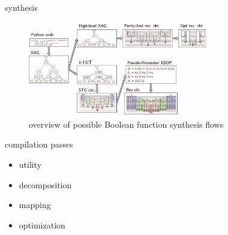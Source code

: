 \begin{frame}{synthesis}
  \begin{figure}[htbq]
    \centering
    \includegraphics[width=0.7\textwidth]{figure/boolean.png}
    \caption{overview of possible Boolean function synthesis flows} 
    \label{fig-boolean}
  \end{figure}
\end{frame}
\begin{frame}{compilation passes}
  \begin{itemize}
    \item utility
    \item decomposition
    \item mapping
    \item optimization
  \end{itemize}
\end{frame}
